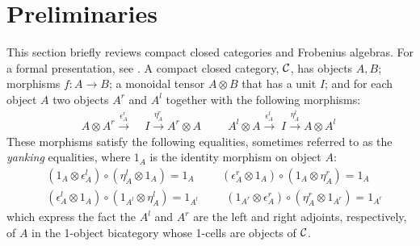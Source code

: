 
\section{Preliminaries}
\label{prelim}


This section briefly reviews compact closed
categories and Frobenius algebras. For a formal presentation, see
\cite{KellyLaplaza80,Kock72,Baez}.  A compact closed category, $\mathcal{C}$, has objects $A, B$; morphisms $f \colon A
\to B$; a monoidal tensor $A \otimes B$ that has a unit $I$; and for
each object $A$ two objects $A^r$ and $A^l$ together with the
following morphisms:
\begin{align*}
A \otimes A^r \stackrel{\epsilon_A^r} {\longrightarrow} \; &I
\stackrel{\eta_A^r}{\longrightarrow} A^r \otimes A \hspace{1cm}
A^l \otimes A \stackrel{\epsilon_A^l}{\longrightarrow} \; I
\stackrel{\eta_A^l}{\longrightarrow} A \otimes A^l\
\end{align*}
These morphisms satisfy the following equalities, sometimes
referred to as the \emph{yanking} equalities, where $1_A$ is the
identity morphism on object $A$:
\begin{align*}
& (1_A \otimes \epsilon_A^l) \circ (\eta_A^l \otimes 1_A)  = 1_A 
\hspace{1cm}
(\epsilon_A^r \otimes 1_A) \circ (1_A \otimes
  \eta_A^r)   = 1_A\\
& (\epsilon_A^l \otimes 1_A) \circ (1_{A^l} \otimes
  \eta_A^l) = 1_{A^l}  
    \hspace{1cm}
    (1_{A^r} \otimes \epsilon_A^r) \circ (\eta_A^r \otimes 1_{A^r}) = 1_{A^r}
\end{align*}
%
\noindent which express the fact the $A^l$ and $A^r$ are the left and right
adjoints, respectively, of $A$ in the 1-object bicategory whose
1-cells are objects of $\mathcal{C}$.


